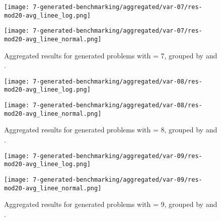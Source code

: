 \begin{appendices}
\begin{figure}[H]
  \centering
  \begin{minipage}{1\textwidth}
    \centering
    \texttt{[image: 7-generated-benchmarking/aggregated/var-07/res-mod20-avg\_linee\_log.png]}
  \end{minipage}
  \hfill
  \begin{minipage}{1\textwidth}
    \centering
    \texttt{[image: 7-generated-benchmarking/aggregated/var-07/res-mod20-avg\_linee\_normal.png]}
  \end{minipage}
  \caption{Aggregated results for generated problems with  = 7, grouped by  and .}\label{fig:app-agg-var7-mod20}
\end{figure}
\begin{figure}[H]
  \centering
  \begin{minipage}{1\textwidth}
    \centering
    \texttt{[image: 7-generated-benchmarking/aggregated/var-08/res-mod20-avg\_linee\_log.png]}
  \end{minipage}
  \hfill
  \begin{minipage}{1\textwidth}
    \centering
    \texttt{[image: 7-generated-benchmarking/aggregated/var-08/res-mod20-avg\_linee\_normal.png]}
  \end{minipage}
  \caption{Aggregated results for generated problems with  = 8, grouped by  and .}\label{fig:app-agg-var8-mod20}
\end{figure}

\begin{figure}[H]
  \centering
  \begin{minipage}{1\textwidth}
    \centering
    \texttt{[image: 7-generated-benchmarking/aggregated/var-09/res-mod20-avg\_linee\_log.png]}
  \end{minipage}
  \hfill
  \begin{minipage}{1\textwidth}
    \centering
    \texttt{[image: 7-generated-benchmarking/aggregated/var-09/res-mod20-avg\_linee\_normal.png]}
  \end{minipage}
  \caption{Aggregated results for generated problems with  = 9, grouped by  and .}\label{fig:app-agg-var9-mod20}
\end{figure}

\end{appendices}